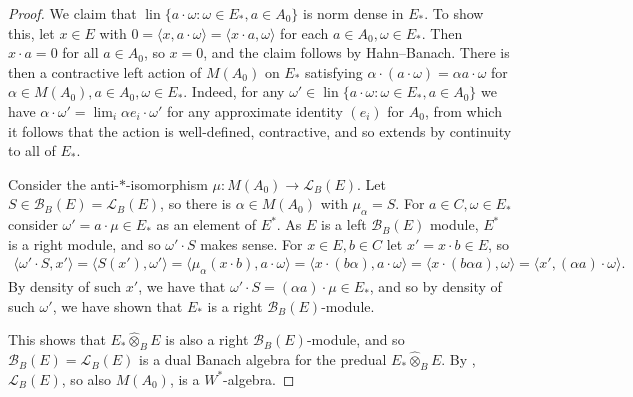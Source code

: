 \documentclass[a4paper,11pt]{article}
\theoremstyle{plain}
\theoremstyle{remark}
\newcommand{\mc}[1]{\mathcal{#1}}
\newcommand{\ip}[2]{{\langle {#1} , {#2} \rangle}}
\newcommand{\lin}{\operatorname{lin}}
\newcommand{\proten}{\widehat\otimes}
\begin{document}
\begin{proof}
We claim that $\lin\{ a\cdot \omega : \omega\in E_*, a\in A_0 \}$ is norm dense in $E_*$.  To show this, let $x\in E$ with $0 = \ip{x}{a\cdot\omega} = \ip{x\cdot a}{\omega}$ for each $a\in A_0, \omega\in E_*$.  Then $x\cdot a=0$ for all $a\in A_0$, so $x=0$, and the claim follows by Hahn--Banach.  There is then a contractive left action of $M(A_0)$ on $E_*$ satisfying $\alpha\cdot (a\cdot\omega) = \alpha a \cdot \omega$ for $\alpha\in M(A_0), a\in A_0, \omega\in E_*$.  Indeed, for any $\omega' \in \lin\{ a\cdot \omega : \omega\in E_*, a\in A_0 \}$ we have $\alpha \cdot \omega' = \lim_i \alpha e_i \cdot \omega'$ for any approximate identity $(e_i)$ for $A_0$, from which it follows that the action is well-defined, contractive, and so extends by continuity to all of $E_*$.

Consider the anti-$*$-isomorphism $\mu \colon M(A_0) \to \mc L_B(E)$.  Let $S\in\mc B_B(E) = \mc L_B(E)$, so there is $\alpha\in M(A_0)$ with $\mu_\alpha = S$.  For $a\in C, \omega\in E_*$ consider $\omega' = a\cdot \mu \in E_*$ as an element of $E^*$.  As $E$ is a left $\mc B_B(E)$ module, $E^*$ is a right module, and so $\omega'\cdot S$ makes sense.  For $x\in E, b\in C$ let $x' = x\cdot b\in E$, so
\begin{align*}
\ip{\omega'\cdot S}{x'} = \ip{S(x')}{\omega'}
= \ip{\mu_\alpha(x\cdot b)}{a\cdot\omega} = \ip{x\cdot(b \alpha)}{a\cdot\omega}
= \ip{x\cdot(b\alpha a)}{\omega}
= \ip{x'}{(\alpha a)\cdot \omega}.
\end{align*}
By density of such $x'$, we have that $\omega'\cdot S = (\alpha a)\cdot \mu \in E_*$, and so by density of such $\omega'$, we have shown that $E_*$ is a right $\mc B_B(E)$-module.



This shows that $E_* \proten_B E$ is also a right $\mc B_B(E)$-module, and so $\mc B_B(E) = \mc L_B(E)$ is a dual Banach algebra for the predual $E_* \proten_B E$.  By \cite[???]{new_paper}, $\mc L_B(E)$, so also $M(A_0)$, is a $W^*$-algebra.


\end{proof}
\end{document}
